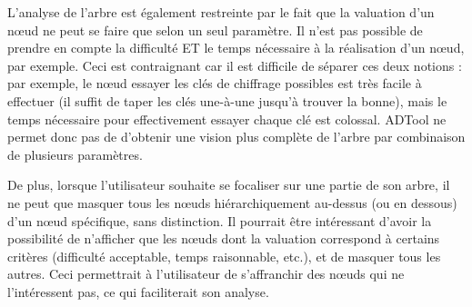 	L'analyse de l'arbre est également restreinte par le fait que la valuation d'un nœud ne peut se faire que selon un seul paramètre. Il n'est pas possible de prendre en compte la \og difficulté \fg{} ET le \og temps nécessaire \fg{} à la réalisation d'un nœud, par exemple. Ceci est contraignant car il est difficile de séparer ces deux notions : par exemple, le nœud \og essayer les clés de chiffrage possibles \fg{} est très facile à effectuer (il suffit de taper les clés une-à-une jusqu'à trouver la bonne), mais le temps nécessaire pour effectivement essayer chaque clé est colossal. ADTool ne permet donc pas de d'obtenir une vision plus complète de l'arbre par combinaison de plusieurs paramètres.
	
	 De plus, lorsque l'utilisateur souhaite se focaliser sur une partie de son arbre, il ne peut que masquer tous les nœuds hiérarchiquement au-dessus (ou en dessous) d'un nœud spécifique, sans distinction. Il pourrait être intéressant d'avoir la possibilité de n'afficher que les nœuds dont la valuation correspond à certains critères (difficulté acceptable, temps raisonnable, etc.), et de masquer tous les autres. Ceci permettrait à l'utilisateur de s'affranchir des nœuds qui ne l'intéressent pas, ce qui faciliterait son analyse.
	 
	 
	 